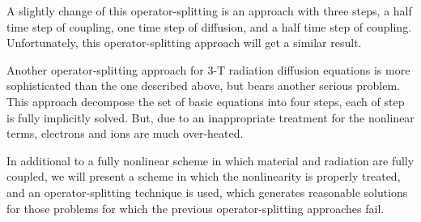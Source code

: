 \documentclass{report}
\begin{document}
A slightly change of this operator-splitting is an approach with three
steps, a half time step of coupling, one time step of diffusion, and a
half time step of coupling. Unfortunately, this operator-splitting
approach will get a similar result.

Another operator-splitting approach for 3-T radiation diffusion equations
is more sophisticated than the one described above, but bears another
serious problem. This approach decompose the set of basic equations into
four steps, each of step is fully implicitly solved. But, due to an
inappropriate treatment for the nonlinear terms, electrons and ions are
much over-heated.

In additional to a fully nonlinear scheme in which material and radiation
are fully coupled, we will present a scheme in which the nonlinearity is
properly treated, and an operator-splitting technique is used, which
generates reasonable solutions for those problems for which the previous
operator-splitting approaches fail.
\end{document}
